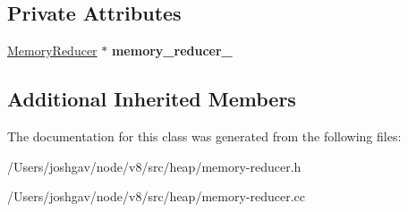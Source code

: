 \subsection*{Private Attributes}
\begin{DoxyCompactItemize}
\item 
\hyperlink{classv8_1_1internal_1_1_memory_reducer}{Memory\+Reducer} $\ast$ {\bfseries memory\+\_\+reducer\+\_\+}\hypertarget{classv8_1_1internal_1_1_memory_reducer_1_1_timer_task_af62430b445728efd6be900823db9a057}{}\label{classv8_1_1internal_1_1_memory_reducer_1_1_timer_task_af62430b445728efd6be900823db9a057}

\end{DoxyCompactItemize}
\subsection*{Additional Inherited Members}


The documentation for this class was generated from the following files\+:\begin{DoxyCompactItemize}
\item 
/\+Users/joshgav/node/v8/src/heap/memory-\/reducer.\+h\item 
/\+Users/joshgav/node/v8/src/heap/memory-\/reducer.\+cc\end{DoxyCompactItemize}
